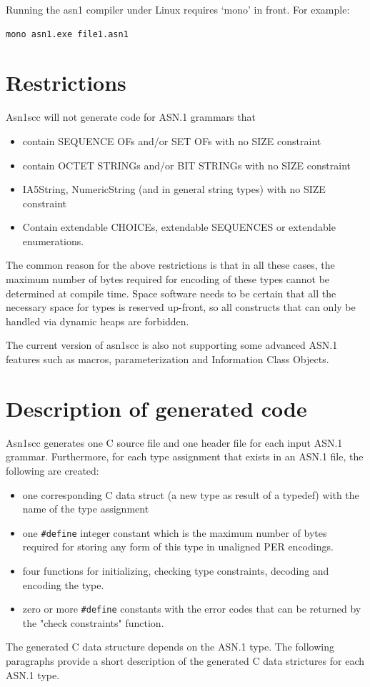 \documentclass[11pt]{book}
\begin{document}
Running the asn1 compiler under Linux requires ‘mono’ in front. For example:

\begin{lstlisting}[language=bash]
mono asn1.exe file1.asn1
\end{lstlisting}

   \section{Restrictions}
   Asn1scc will not generate code for ASN.1 grammars that
   \begin{itemize}
      \item
         contain SEQUENCE OFs and/or SET OFs with no SIZE constraint
      \item
         contain OCTET STRINGs and/or BIT STRINGs with no SIZE constraint
      \item
         IA5String, NumericString (and in general string types) with no SIZE constraint
      \item
         Contain extendable CHOICEs, extendable SEQUENCES or extendable enumerations.
   \end{itemize}

   The common reason for the above restrictions is that in all these cases, the maximum 
   number of bytes required for encoding of these types cannot 
   be determined at compile time. Space software needs to be certain that all the necessary space for types
   is reserved up-front, so all constructs that can only be handled via dynamic heaps are forbidden.

   The current version of asn1scc is also not supporting some advanced ASN.1 features 
   such as macros, parameterization and Information Class Objects. 

   \section{Description of generated code}
   Asn1scc generates one C source file and one header file for each input ASN.1 grammar. 
   Furthermore, for each type assignment that exists in an ASN.1 file, the following are created:
   \begin{itemize}
      \item
         one corresponding C data struct (a new type as result of a typedef) 
         with the name of the type assignment
      \item
         one \texttt{\#define} integer constant which is the maximum number of bytes 
         required for storing any form of this type in unaligned PER encodings. 
      \item
         four functions for initializing, checking type constraints, 
         decoding and encoding the type. 
      \item
         zero or more \texttt{\#define} constants with the error codes that can be returned by the "check constraints" function.
   \end{itemize}
   The generated C data structure depends on the ASN.1 type. 
   The following paragraphs provide a short description of the generated 
   C data strictures for each ASN.1 type.
\end{document}
